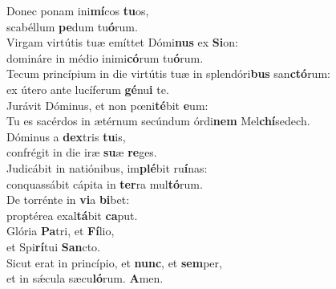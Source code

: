 \evenverse Donec ponam ini\textbf{mí}cos \textbf{tu}os,~\*\\
\evenverse scabéllum \textbf{pe}dum tu\textbf{ó}rum.\\
\oddverse Virgam virtútis tuæ emíttet Dómi\textbf{nus} ex \textbf{Si}on:~\*\\
\oddverse domináre in médio inimi\textbf{có}rum tu\textbf{ó}rum.\\
\evenverse Tecum princípium in die virtútis tuæ in splendóri\textbf{bus} san\textbf{ctó}rum:~\*\\
\evenverse ex útero ante lucíferum \textbf{gé}nu\textbf{i} te.\\
\oddverse Jurávit Dóminus, et non pœni\textbf{té}bit \textbf{e}um:~\*\\
\oddverse Tu es sacérdos in ætérnum secúndum órdi\textbf{nem} Mel\textbf{chí}sedech.\\
\evenverse Dóminus a \textbf{dex}tris \textbf{tu}is,~\*\\
\evenverse confrégit in die iræ \textbf{su}æ \textbf{re}ges.\\
\oddverse Judicábit in natiónibus, im\textbf{plé}bit ru\textbf{í}nas:~\*\\
\oddverse conquassábit cápita in \textbf{ter}ra mul\textbf{tó}rum.\\
\evenverse De torrénte in \textbf{vi}a \textbf{bi}bet:~\*\\
\evenverse proptérea exal\textbf{tá}bit \textbf{ca}put.\\
\oddverse Glória \textbf{Pa}tri, et \textbf{Fí}lio,~\*\\
\oddverse et Spi\textbf{rí}tui \textbf{San}cto.\\
\evenverse Sicut erat in princípio, et \textbf{nunc}, et \textbf{sem}per,~\*\\
\evenverse et in sǽcula sæcu\textbf{ló}rum. \textbf{A}men.\\
